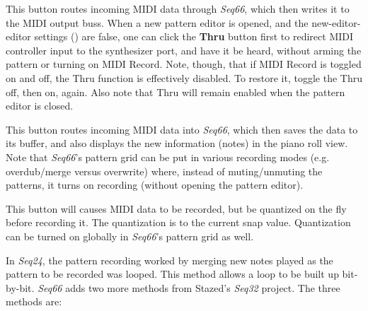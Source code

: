 \begin{itemize}
   This button routes incoming MIDI data through
   \textsl{Seq66}, which then writes it to the MIDI output buss.
   When a new pattern editor is opened,
   and the new-editor-editor settings
   ()
   are false, one can click the
   \textbf{Thru} button first to redirect MIDI controller input
   to the synthesizer port, and have it be heard, without
   arming the pattern or turning on MIDI Record.
   Note, though, that if MIDI Record is toggled on and off, the
   Thru function is effectively disabled.  To restore it,
   toggle the Thru off, then on, again.
   Also note that Thru will remain enabled when the pattern editor is closed.

   This button routes incoming MIDI data into
   \textsl{Seq66}, which then saves the data to its buffer, and also
   displays the new information (notes) in the piano roll view.
   Note that \textsl{Seq66}'s pattern grid can be put in various recording
   modes (e.g. overdub/merge versus overwrite) where, instead of
   muting/unmuting the patterns, it turns on recording (without opening the
   pattern editor).

   This button will causes MIDI data to be recorded, but be
   quantized on the fly before recording it.
   The quantization is to the current snap value.
   Quantization can be turned on globally in \textsl{Seq66}'s pattern grid
   as well.

   In \textsl{Seq24}, the pattern recording worked by merging new notes played
   as the pattern to be recorded was looped.  This method allows a loop to be
   built up bit-by-bit.  \textsl{Seq66} adds two more methods from
   Stazed's \textsl{Seq32} project.  The three methods are:


\end{itemize}
